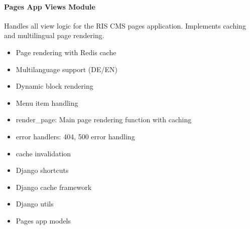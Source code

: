 \documentclass[letterpaper,10pt,english]{sphinxmanual}
\begin{document}
\paragraph{Pages App Views Module}
\label{\detokenize{pages_app:id1}}
\sphinxAtStartPar
Handles all view logic for the RIS CMS pages application.
Implements caching and multilingual page rendering.
\begin{description}
\begin{itemize}
\item {} 
\sphinxAtStartPar
Page rendering with Redis cache

\item {} 
\sphinxAtStartPar
Multi\sphinxhyphen{}language support (DE/EN)

\item {} 
\sphinxAtStartPar
Dynamic block rendering

\item {} 
\sphinxAtStartPar
Menu item handling

\end{itemize}

\begin{itemize}
\item {} 
\sphinxAtStartPar
render\_page: Main page rendering function with caching

\item {} 
\sphinxAtStartPar
error handlers: 404, 500 error handling

\item {} 
\sphinxAtStartPar
cache invalidation

\end{itemize}

\begin{itemize}
\item {} 
\sphinxAtStartPar
Django shortcuts

\item {} 
\sphinxAtStartPar
Django cache framework

\item {} 
\sphinxAtStartPar
Django utils

\item {} 
\sphinxAtStartPar
Pages app models

\end{itemize}

\end{description}
\end{document}
